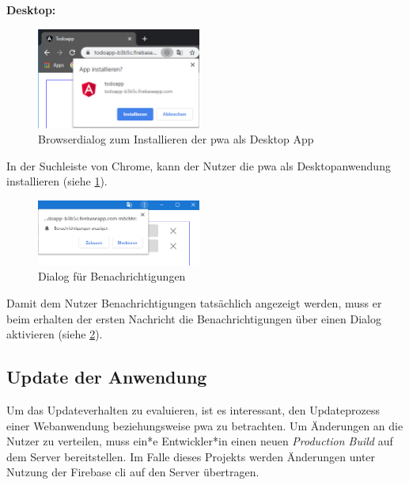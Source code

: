 \textbf{Desktop:}
\begin{figure}
	\vspace{-10pt}
	\includegraphics[width=0.48\textwidth]{img/add_to_desktop_2.PNG}
	\caption{Browserdialog zum Installieren der \ac{pwa} als Desktop App}
	\label{fig:dialog_install_pwa_mobile}
	\vspace{-10pt}
\end{figure}
In der Suchleiste von Chrome, kann der Nutzer die \ac{pwa} als Desktopanwendung installieren (siehe \ref{fig:dialog_install_pwa_mobile}).
\begin{figure}
	\vspace{-10pt}
	\includegraphics[width=0.48\textwidth]{img/berechtigungen_zulassen.PNG}
	\centering
	\caption{Dialog für Benachrichtigungen}
	\label{fig:pwa_benachrichtigungen_zulassen}
	\vspace{-10pt}
\end{figure}
Damit dem Nutzer Benachrichtigungen tatsächlich angezeigt werden, muss er beim erhalten der ersten Nachricht die Benachrichtigungen über einen Dialog aktivieren (siehe \ref{fig:pwa_benachrichtigungen_zulassen}).

\subsection{Update der Anwendung}

Um das Updateverhalten zu evaluieren, ist es interessant, den Updateprozess einer Webanwendung beziehungsweise \ac{pwa} zu betrachten. Um Änderungen an die Nutzer zu verteilen, muss ein*e Entwickler*in einen neuen \textit{Production Build} auf dem Server bereitstellen. Im Falle dieses Projekts werden Änderungen unter Nutzung der Firebase \ac{cli} auf den Server übertragen.

